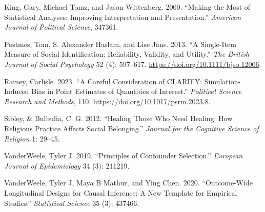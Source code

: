 \documentclass[
  singlecolumn]{report}
\newlength{\cslhangindent}
\newlength{\cslentryspacingunit} %
\newenvironment{CSLReferences}[2] %
 {%
  \setlength{\parindent}{0pt}
  \ifodd #1
  \let\oldpar\par
  \def\par{\hangindent=\cslhangindent\oldpar}
  \fi
  \setlength{\parskip}{#2\cslentryspacingunit}
 }%
 {}
\begin{document}
\begin{CSLReferences}{1}{0}
\leavevmode{}%
King, Gary, Michael Tomz, and Jason Wittenberg. 2000. {``Making the Most
of Statistical Analyses: Improving Interpretation and Presentation.''}
\emph{American Journal of Political Science}, 347361.

\leavevmode{}%
Postmes, Tom, S. Alexander Haslam, and Lise Jans. 2013. {``A Single-Item
Measure of Social Identification: Reliability, Validity, and Utility.''}
\emph{The British Journal of Social Psychology} 52 (4): 597--617.
\url{https://doi.org/10.1111/bjso.12006}.

\leavevmode{}%
Rainey, Carlisle. 2023. {``A Careful Consideration of CLARIFY:
Simulation-Induced Bias in Point Estimates of Quantities of Interest.''}
\emph{Political Science Research and Methods}, 110.
\url{https://doi.org/10.1017/psrm.2023.8}.

\leavevmode{}%
Sibley, \& Bulbulia, C. G. 2012. {``Healing Those Who Need Healing: How
Religious Practice Affects Social Belonging.''} \emph{Journal for the
Cognitive Science of Religion} 1: 29--45.

\leavevmode{}%
VanderWeele, Tyler J. 2019. {``Principles of Confounder Selection.''}
\emph{European Journal of Epidemiology} 34 (3): 211219.

\leavevmode{}%
VanderWeele, Tyler J, Maya B Mathur, and Ying Chen. 2020.
{``Outcome-Wide Longitudinal Designs for Causal Inference: A New
Template for Empirical Studies.''} \emph{Statistical Science} 35 (3):
437466.

\end{CSLReferences}
\end{document}
